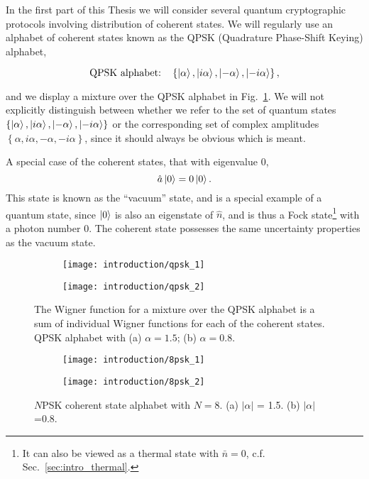 \noindent In the first part of this Thesis we will consider several quantum cryptographic protocols involving distribution of coherent states. We will regularly use an alphabet of coherent states known as the QPSK (Quadrature Phase-Shift Keying) alphabet, 

\begin{equation}
\qq*{QPSK alphabet:} \left\{\ket{\alpha}, \ket{i \alpha}, \ket{- \alpha}, \ket{- i \alpha}\right\},
\end{equation}

\noindent and we display a mixture over the QPSK alphabet in Fig.~\ref{fig:qpsk}. We will not explicitly distinguish between whether we refer to the set of quantum states $\left\{\ket{\alpha}, \ket{i \alpha}, \ket{- \alpha}, \ket{- i \alpha}\right\}$ or the corresponding set of complex amplitudes $\left\{ \alpha, i \alpha, -\alpha, - i\alpha\right\}$, since it should always be obvious which is meant.

A special case of the coherent states, that with eigenvalue $0$,
\begin{equation}
\hat{a} \ket{0} = 0 \ket{0}.
\end{equation}
\noindent This state is known as the ``vacuum'' state, and is a special example of a quantum state, since $\ket{0}$ is also an eigenstate of $\hat{n}$, and is thus a Fock state\footnote{It can also be viewed as a thermal state with $\bar{n}=0$, c.f. Sec.~\ref{sec:intro_thermal}.} with a photon number $0$. The coherent state possesses the same uncertainty properties as the vacuum state.


\begin{figure}[htp]
\captionsetup{width=0.8\linewidth}
\centering
\begin{subfigure}[b]{0.49\linewidth}
\texttt{[image: introduction/qpsk\_1]}
\caption{}
\end{subfigure}
\begin{subfigure}[b]{0.49\linewidth}
\texttt{[image: introduction/qpsk\_2]}
\caption{}
\end{subfigure}
\caption{\label{fig:qpsk} The Wigner function for a mixture over the QPSK alphabet is a sum of individual Wigner functions for each of the coherent states. QPSK alphabet with (a) $\alpha=1.5$; (b) $\alpha=0.8$.}
\end{figure}

\begin{figure}[htp]
\captionsetup{width=0.8\linewidth}
\centering
\begin{subfigure}[b]{0.49\linewidth}
\texttt{[image: introduction/8psk\_1]}
\caption{}
\end{subfigure}
\begin{subfigure}[b]{0.49\linewidth}
\texttt{[image: introduction/8psk\_2]}
\caption{}
\end{subfigure}
\caption{\label{fig:intro_npsk} $N$PSK coherent state alphabet with $N=8$. (a) $\left|\alpha\right|$ = 1.5. (b) $\left|\alpha\right|$=0.8.}
\end{figure}

